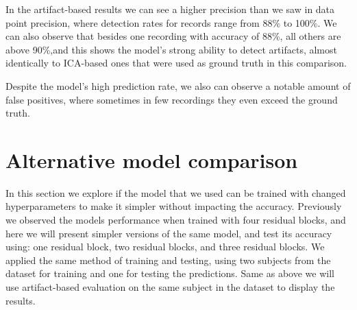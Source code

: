 \documentclass[12pt,a4paper,titlepage,openany]{report}
\begin{document}
\begin{table}[ht]
\centering
{}
\caption{Artifact Evaluation per Recording}
\label{tab:artifact_eval}
\end{table}

In the artifact-based results we can see a higher precision than we saw in data point precision, where detection rates for records range from 88\% to 100\%. We can also observe that besides one recording with accuracy of 88\%, all others are above 90\%,and this shows the model's strong ability to detect artifacts, almost identically to ICA-based ones that were used as ground truth in this comparison.

Despite the model's high prediction rate, we also can observe a notable amount of false positives, where sometimes in few recordings they even exceed the ground truth.

\newpage
\section{Alternative model comparison}

In this section we explore if the model that we used can be trained with changed hyperparameters to make it simpler without impacting the accuracy. Previously we observed the models performance when trained with four residual blocks, and here we will present simpler versions of the same model, and test its accuracy using: one residual block, two residual blocks, and three residual blocks.
We applied the same method of training and testing, using two subjects from the dataset for training and one for testing the predictions. Same as above we will use artifact-based evaluation on the same subject in the dataset to display the results.
\end{document}
